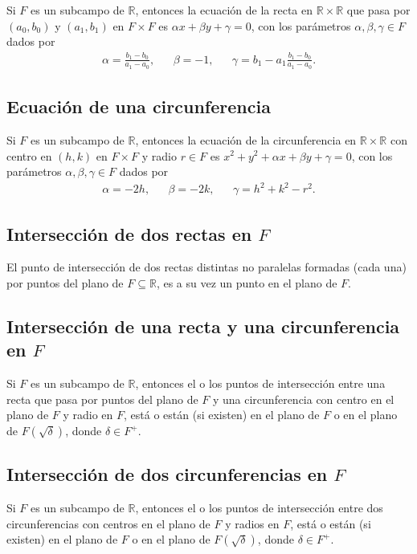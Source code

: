 \documentclass{article}
\begin{document}
Si $F$ es un subcampo de $\mathbb{R}$, entonces la ecuación de la recta en $\mathbb{R}\times\mathbb{R}$ que pasa por $(a_0,b_0)$ y $(a_1,b_1)$ en $F\times F$ es $\alpha x+\beta y+\gamma=0$, con los parámetros $\alpha,\beta,\gamma\in F$ dados por
\begin{align*}
\alpha=\frac{b_1-b_0}{a_1-a_0}, && \beta=-1, && \gamma=b_1-a_1\frac{b_1-b_0}{a_1-a_0}.
\end{align*}

\subsection*{\color{purple} Ecuación de una circunferencia}

Si $F$ es un subcampo de $\mathbb{R}$, entonces la ecuación de la circunferencia en $\mathbb{R}\times\mathbb{R}$ con centro en $(h,k)$ en $F\times F$ y radio $r\in F$ es $x^2+y^2+\alpha x+\beta y+\gamma=0$, con los parámetros $\alpha,\beta,\gamma\in F$ dados por
\begin{align*}
\alpha=-2h, && \beta=-2k, && \gamma=h^2+k^2-r^2.
\end{align*}

\subsection*{\color{purple} Intersección de dos rectas en $F$}

El punto de intersección de dos rectas distintas no paralelas formadas (cada una) por puntos del plano de $F\subseteq\mathbb{R}$, es a su vez un punto en el plano de $F$.

\subsection*{\color{purple} Intersección de una recta y una circunferencia en $F$}

Si $F$ es un subcampo de $\mathbb{R}$, entonces el o los puntos de intersección entre una recta que pasa por puntos del plano de $F$ y una circunferencia con centro en el plano de $F$ y radio en $F$, está o están (si existen) en el plano de $F$ o en el plano de $F(\sqrt{\delta})$, donde $\delta\in F^{+}$.

\subsection*{\color{purple} Intersección de dos circunferencias en $F$}

Si $F$ es un subcampo de $\mathbb{R}$, entonces el o los puntos de intersección entre dos circunferencias con centros en el plano de $F$ y radios en $F$, está o están (si existen) en el plano de $F$ o en el plano de $F(\sqrt{\delta})$, donde $\delta\in F^{+}$.
\end{document}
